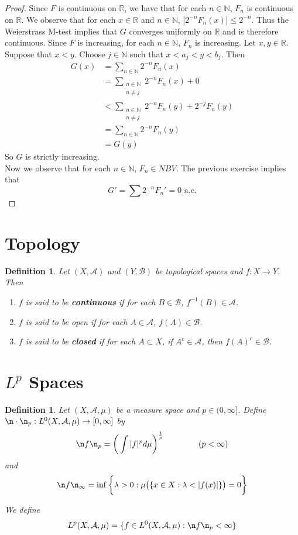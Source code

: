 \documentclass[12pt]{amsart}
\newtheorem{defn}[thm]{Definition}
\newcommand{\lam}{\lambda}
\newcommand{\N}{\mathbb{N}}
\newcommand{\R}{\mathbb{R}}
\newcommand{\MA}{\mathcal{A}}
\newcommand{\MB}{\mathcal{B}}
\begin{document}
\begin{proof}
	Since $F$ is continuous on $\R$, we have that for each $n \in \N$, $F_n$ is continuous on $\R$. We observe that for each $x \in \R$ and $n \in \N$, $|2^{-n}F_n(x)| \leq 2^{-n}$. Thus the Weierstrass M-test implies that $G$ converges uniformly on $\R$ and is therefore continuous. Since $F$ is increasing, for each $n \in \N$, $F_n$ is increasing. Let $x, y \in \R$. Suppose that $x<y$. Choose $j \in \N$ such that $x<a_j<y<b_j$. Then 
	\begin{align*}
		G(x) 
		&= \sum_{n \in \N}2^{-n}F_n(x)\\
		&= \sum_{\substack{n \in \N \\ n \neq j}}2^{-n}F_n(x) + 0\\
		& < \sum_{\substack{n \in \N \\ n \neq j}}2^{-n}F_n(y) + 2^{-j}F_n(y)\\
		&=\sum_{n \in \N}2^{-n}F_n(y)\\
		&=G(y)
	\end{align*}
	So $G$ is strictly increasing.\\
	Now we observe that for each $n \in \N$, $F_n \in NBV$. The previous exercise implies that $$G' = \sum 2^{-n}F_n'=0 \text{ a.e.}$$
\end{proof}

\section{Topology}

\begin{defn}
	Let $(X,\MA)$ and $(Y,\MB)$ be topological spaces and $f:X \rightarrow Y$. Then 
	\begin{enumerate}
		\item $f$ is said to be \textbf{continuous} if for each $B \in \MB$, $f^{-1}(B) \in \MA$.
		\item $f$ is said to be open if for each $A \in \MA$, $f(A) \in \MB$.
		\item $f$ is said to be \textbf{closed} if for each $A \subset X$, if $A^c \in \MA$, then $f(A)^c \in \MB$.
	\end{enumerate}
\end{defn}

\section{$L^{p}$ Spaces}

\begin{defn}
	Let $(X, \MA, \mu)$ be a measure space and $p \in (0, \infty]$. Define $ \n \cdot \n_p : L^0(X, \MA, \mu) \rightarrow [0, \infty]$ by $$\n f \n_p = \bigg(\int \vert f \vert^p d\mu \bigg)^{\frac{1}{p}} \hspace{1.5cm}( p < \infty)$$ 
	and 
	$$\n f \n_{\infty} = \inf \bigg \{\lam >0: \mu\big(\{x \in X: \lam < \vert f(x) \vert  \}\big) = 0 \bigg \} $$
	
	
	We define $$L^p(X, \MA, \mu) =  \{f \in L^0(X, \MA, \mu): \n f \n_p < \infty \}$$
\end{defn}
\end{document}
